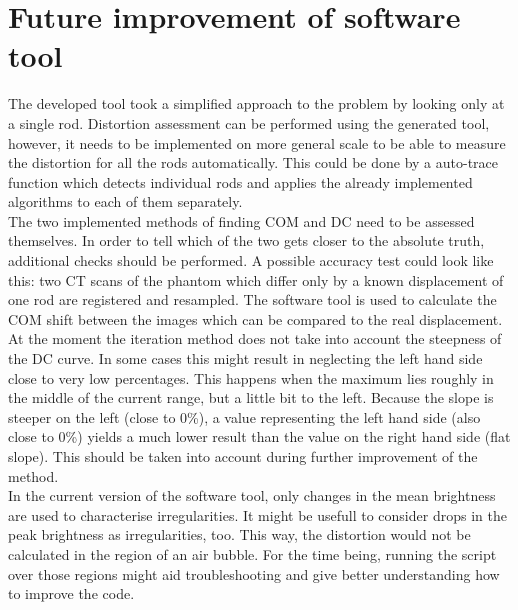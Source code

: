     
\section{Future improvement of software tool}

The developed tool took a simplified approach to the problem by looking only at a single rod.
Distortion assessment can be performed using the generated tool, however, it needs to be implemented on more general scale to be able to measure the distortion for all the rods automatically.
This could be done by a auto-trace function which detects individual rods and applies the already implemented algorithms to each of them separately.\\

The two implemented methods of finding COM and DC need to be assessed themselves.
In order to tell which of the two gets closer to the absolute truth, additional checks should be performed.
A possible accuracy test could look like this:
two CT scans of the phantom which differ only by a known displacement of one rod are registered and resampled.
The software tool is used to calculate the COM shift between the images which can be compared to the real displacement.\\

At the moment the iteration method does not take into account the steepness of the DC curve.
In some cases this might result in neglecting the left hand side close to very low percentages.
This happens when the maximum lies roughly in the middle of the current range, but a little bit to the left.
Because the slope is steeper on the left (close to 0\%), a value representing the left hand side (also close to 0\%) yields a much lower result than the value on the right hand side (flat slope).
This should be taken into account during further improvement of the method.\\

In the current version of the software tool, only changes in the mean brightness are used to characterise irregularities.
It might be usefull to consider drops in the peak brightness as irregularities, too.
This way, the distortion would not be calculated in the region of an air bubble.
For the time being, running the script over those regions might aid troubleshooting and give better understanding how to improve the code.\\


